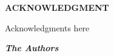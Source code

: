 \begin{center}
{\bf ACKNOWLEDGMENT}\\[24pt]
\end{center}
{\baselineskip

Acknowledgments here

\begin{flushright}
\textbf{\textit{The Authors}}
\end{flushright}



}